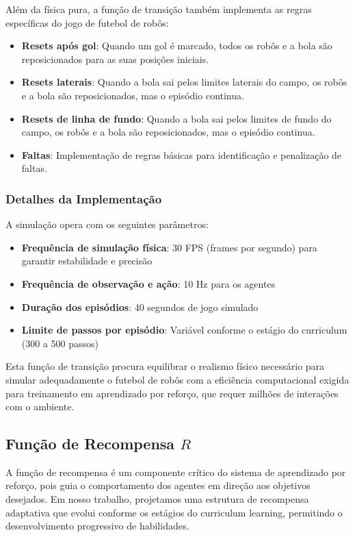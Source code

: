 Além da física pura, a função de transição também implementa as regras específicas do jogo de futebol de robôs:

\begin{itemize}
    \item \textbf{Resets após gol}: Quando um gol é marcado, todos os robôs e a bola são reposicionados para as suas posições iniciais.
    \item \textbf{Resets laterais}: Quando a bola sai pelos limites laterais do campo, os robôs e a bola são reposicionados, mas o episódio continua.
    \item \textbf{Resets de linha de fundo}: Quando a bola sai pelos limites de fundo do campo, os robôs e a bola são reposicionados, mas o episódio continua.
    \item \textbf{Faltas}: Implementação de regras básicas para identificação e penalização de faltas.
\end{itemize}

\subsubsection{Detalhes da Implementação}

A simulação opera com os seguintes parâmetros:

\begin{itemize}
    \item \textbf{Frequência de simulação física}: 30 FPS (frames por segundo) para garantir estabilidade e precisão
    \item \textbf{Frequência de observação e ação}: 10 Hz para os agentes
    \item \textbf{Duração dos episódios}: 40 segundos de jogo simulado
    \item \textbf{Limite de passos por episódio}: Variável conforme o estágio do curriculum (300 a 500 passos)
\end{itemize}

Esta função de transição procura equilibrar o realismo físico necessário para simular adequadamente o futebol de robôs com a eficiência computacional exigida para treinamento em aprendizado por reforço, que requer milhões de interações com o ambiente.

\subsection{Função de Recompensa $R$}

A função de recompensa é um componente crítico do sistema de aprendizado por reforço, pois guia o comportamento dos agentes em direção aos objetivos desejados. Em nosso trabalho, projetamos uma estrutura de recompensa adaptativa que evolui conforme os estágios do curriculum learning, permitindo o desenvolvimento progressivo de habilidades.

